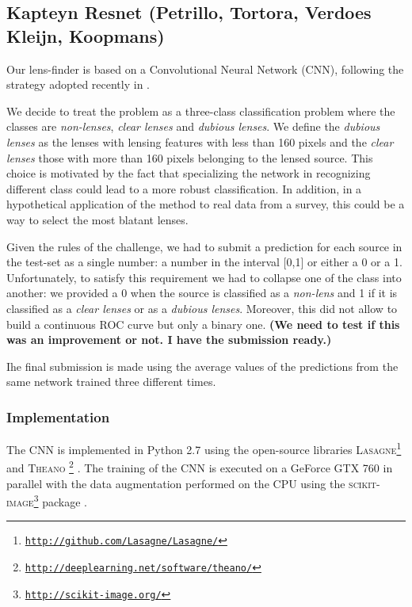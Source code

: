 \documentclass[useAMS,usenatbib]{mnras}
\begin{document}
\subsection{Kapteyn Resnet (Petrillo, Tortora, Verdoes Kleijn, Koopmans) }
Our lens-finder is based on a Convolutional Neural Network (CNN), following the strategy adopted recently in \citep{2017arXiv170207675P}. 

We decide to treat the problem as a three-class classification problem where the classes are \textit{non-lenses}, \textit{clear lenses} and \textit{dubious lenses}. We define the \textit{dubious lenses} as the lenses with lensing features with less than 160 pixels and the \textit{clear lenses} those with more than 160 pixels belonging to the lensed source. This choice is motivated by the fact that specializing the network in recognizing different class could lead to a more robust classification. In addition, in a hypothetical application of the method to real data from a survey, this could be a way to select the most blatant lenses.  

Given the rules of the challenge, we had to submit a prediction for each source in the test-set as a single number: a number in the interval [0,1] or either a 0 or a 1. Unfortunately, to satisfy this requirement we had to collapse one of the class into another: we provided a 0 when the source is classified as a \textit{non-lens} and 1 if it is classified as a \textit{clear lenses} or as a \textit{dubious lenses}. Moreover, this did not allow to build a continuous ROC curve but only a binary one. \textbf{(We need to test if this was an improvement or not. I have the submission ready.)}

Ihe final submission is made using the average values of the predictions from the same network trained three different times.

\subsubsection{Implementation}
The CNN is implemented in Python 2.7 using the open-source libraries \textsc{Lasagne}\footnote{\href{http://github.com/Lasagne/Lasagne/}{\tt http://github.com/Lasagne/Lasagne/}} 
and \textsc{Theano}
\footnote{\href{http://deeplearning.net/software/theano/}{\tt http://deeplearning.net/software/theano/}} \citep{theano}.  
The training of the CNN is executed on a GeForce GTX 760 in parallel with the data augmentation performed on the CPU using the \textsc{scikit-image}\footnote{\href{http://scikit-image.org/}{\tt http://scikit-image.org/}} package \citep{van2014scikit}. 
\end{document}
